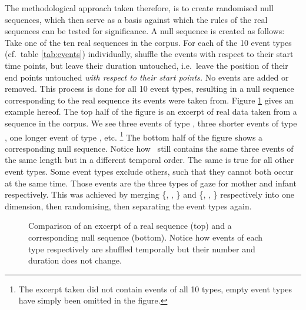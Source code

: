 The methodological approach taken therefore, is to create randomised null sequences, which then serve as a basis against which the rules of the real sequences can be tested for significance.
A null sequence is created as follows:
Take one of the ten real sequences in the corpus.
For each of the 10 event types (cf.~table \ref{tab:events}) individually, shuffle the events with respect to their start time points, but leave their duration untouched, i.e.~leave the position of their end points untouched \emph{with respect to their start points.}
No events are added or removed.
This process is done for all 10 event types, resulting in a null sequence corresponding to the real sequence its events were taken from.
Figure \ref{fig:null} gives an example hereof.
The top half of the figure is an excerpt of real data taken from a sequence in the corpus.
We see three events of type \mosp, three shorter events of type \mogain, one longer event of type \ingamo, etc.%
\footnote{The excerpt taken did not contain events of all 10 types, empty event types have simply been omitted in the figure.}
The bottom half of the figure shows a corresponding null sequence.
Notice how \mosp\ still contains the same three events of the same length but in a different temporal order.
The same is true for all other event types.
Some event types exclude others, such that they cannot both occur at the same time.
Those events are the three types of gaze for mother and infant respectively.
This was achieved by merging \{\mogain, \mogaob, \mogaaw\} and \{\ingamo, \ingaob, \ingaaw\} respectively into one dimension, then randomising, then separating the event types again.

\begin{figure}
	\centering
	
	\label{fig:null}
	\caption[Real and null sequence comparison.]{Comparison of an excerpt of a real sequence (top) and a corresponding null sequence (bottom). Notice how events of each type respectively are shuffled temporally but their number and duration does not change.}
\end{figure}

